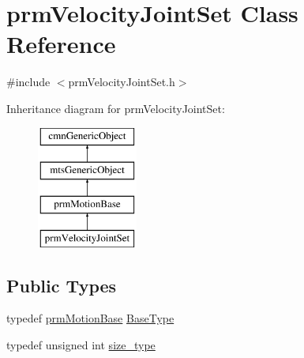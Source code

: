 \hypertarget{classprm_velocity_joint_set}{\section{prm\-Velocity\-Joint\-Set Class Reference}
\label{classprm_velocity_joint_set}
}


{\ttfamily \#include $<$prm\-Velocity\-Joint\-Set.\-h$>$}

Inheritance diagram for prm\-Velocity\-Joint\-Set\-:\begin{figure}[H]
\begin{center}
\leavevmode
\includegraphics[height=4.000000cm]{d5/da9/classprm_velocity_joint_set}
\end{center}
\end{figure}
\subsection*{Public Types}
\begin{DoxyCompactItemize}
\item 
typedef \hyperlink{classprm_motion_base}{prm\-Motion\-Base} \hyperlink{classprm_velocity_joint_set_a8cd5faa63ec2682c605ca6c6e1248f3a}{Base\-Type}
\item 
typedef unsigned int \hyperlink{classprm_velocity_joint_set_a48434c7a4127357203c7cff1e6f2a429}{size\-\_\-type}
\end{DoxyCompactItemize}
